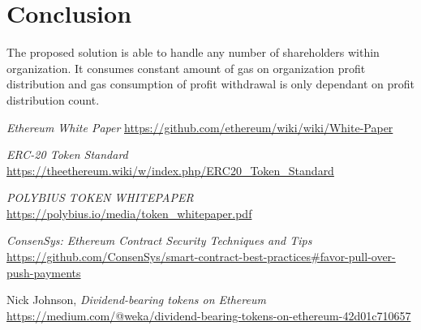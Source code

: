 \documentclass[onecolumn]{article}
\begin{document}
\section{Conclusion}
The proposed solution is able to handle any number of shareholders within organization. It consumes constant amount of gas on organization profit distribution and gas consumption of profit withdrawal is only dependant on profit distribution count.
\begin{thebibliography}{5}
	\emph{Ethereum White Paper}\newline
	\url{https://github.com/ethereum/wiki/wiki/White-Paper}

	\emph{ERC-20 Token Standard}\newline
	\url{https://theethereum.wiki/w/index.php/ERC20_Token_Standard}

	\emph{POLYBIUS TOKEN WHITEPAPER}\newline
	\url{https://polybius.io/media/token_whitepaper.pdf}

	\emph{ConsenSys: Ethereum Contract Security Techniques and Tips}\newline
	\url{https://github.com/ConsenSys/smart-contract-best-practices#favor-pull-over-push-payments}

	Nick Johnson,
	\emph{Dividend-bearing tokens on Ethereum}\newline
	\url{https://medium.com/@weka/dividend-bearing-tokens-on-ethereum-42d01c710657}

\end{thebibliography}
\end{document}
